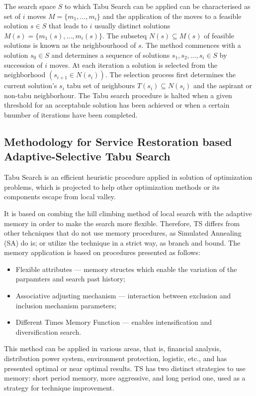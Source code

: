 The search space $S$ to which Tabu Search can be applied can be characterised as set of $i$ moves $M = \{ m_1,\dots,m_i \}$ and the application of the moves to a feasible solution $s \in S$ that leads to $i$ usually distinct solutions $M(s)=\{m_1(s),\dots,m_i(s)\}$. The subseteq $N(s) \subseteq M(s)$ of feasible solutions is known as the neighbourhood of $s$. The method commences with a solution $s_0 \in S$ and determines a sequence of solutions $s_1,s_2,\dots,s_i \in S$ by succession of $i$ moves. At each iteration a solution is selected from the neighborhood $(s_{i+1} \in N(s_i))$. The selection process first determines the current solution's $s_i$ tabu set of neighbours $T(s_i)\subseteq N(s_i)$ and the aspirant or non-tabu neighborhour. The Tabu search procedure is halted when a given threshold for an acceptabnle solution has been achieved or when a certain bnumber of iterations have been completed.

\subsection{Methodology for Service Restoration based Adaptive-Selective Tabu Search}
Tabu Search is an efficient heuristic procedure applied in solution of optimization problems, which is projected to help other optimization methods or its components escape from local valley.

It is based on combing the hill climbing method of local search with the adaptive memory in order to make the search more flexible. Therefore, TS differs from other tehcniques that do not use memory procedures, as Simulated Annealing (SA) do is; or utilize the technique in a strict way, as branch and bound. The memory application is based on procedures presented as follows:
\begin{itemize}
\item Flexible attributes --- memory structes which enable the variation of the parpamters and search past history;
\item Associative adjusting mechanism --- interaction between exclusion and inclusion mechanism parameters;
\item Different Times Memory Function --- enables intensification and diversification search.
\end{itemize}

This method can be applied in various areas, that is, financial analysis, distribution power system, environment protection, logistic, etc., and has presented optimal or near optimal results. TS has two distinct strategies to use memory: short period memory, more aggressive, and long period one, used as a strategy for technique improvement.

